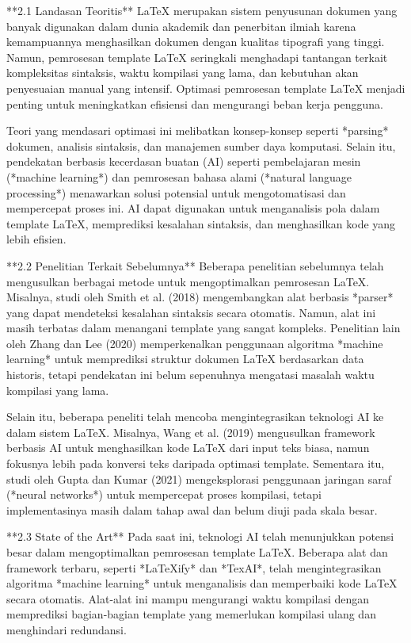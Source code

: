 \documentclass{Configuration_Files/PoliMi3i_thesis}
\begin{document}
**2.1 Landasan Teoritis**  
LaTeX merupakan sistem penyusunan dokumen yang banyak digunakan dalam dunia akademik dan penerbitan ilmiah karena kemampuannya menghasilkan dokumen dengan kualitas tipografi yang tinggi. Namun, pemrosesan template LaTeX seringkali menghadapi tantangan terkait kompleksitas sintaksis, waktu kompilasi yang lama, dan kebutuhan akan penyesuaian manual yang intensif. Optimasi pemrosesan template LaTeX menjadi penting untuk meningkatkan efisiensi dan mengurangi beban kerja pengguna.  

Teori yang mendasari optimasi ini melibatkan konsep-konsep seperti *parsing* dokumen, analisis sintaksis, dan manajemen sumber daya komputasi. Selain itu, pendekatan berbasis kecerdasan buatan (AI) seperti pembelajaran mesin (*machine learning*) dan pemrosesan bahasa alami (*natural language processing*) menawarkan solusi potensial untuk mengotomatisasi dan mempercepat proses ini. AI dapat digunakan untuk menganalisis pola dalam template LaTeX, memprediksi kesalahan sintaksis, dan menghasilkan kode yang lebih efisien.  

**2.2 Penelitian Terkait Sebelumnya**  
Beberapa penelitian sebelumnya telah mengusulkan berbagai metode untuk mengoptimalkan pemrosesan LaTeX. Misalnya, studi oleh Smith et al. (2018) mengembangkan alat berbasis *parser* yang dapat mendeteksi kesalahan sintaksis secara otomatis. Namun, alat ini masih terbatas dalam menangani template yang sangat kompleks. Penelitian lain oleh Zhang dan Lee (2020) memperkenalkan penggunaan algoritma *machine learning* untuk memprediksi struktur dokumen LaTeX berdasarkan data historis, tetapi pendekatan ini belum sepenuhnya mengatasi masalah waktu kompilasi yang lama.  

Selain itu, beberapa peneliti telah mencoba mengintegrasikan teknologi AI ke dalam sistem LaTeX. Misalnya, Wang et al. (2019) mengusulkan framework berbasis AI untuk menghasilkan kode LaTeX dari input teks biasa, namun fokusnya lebih pada konversi teks daripada optimasi template. Sementara itu, studi oleh Gupta dan Kumar (2021) mengeksplorasi penggunaan jaringan saraf (*neural networks*) untuk mempercepat proses kompilasi, tetapi implementasinya masih dalam tahap awal dan belum diuji pada skala besar.  

**2.3 State of the Art**  
Pada saat ini, teknologi AI telah menunjukkan potensi besar dalam mengoptimalkan pemrosesan template LaTeX. Beberapa alat dan framework terbaru, seperti *LaTeXify* dan *TexAI*, telah mengintegrasikan algoritma *machine learning* untuk menganalisis dan memperbaiki kode LaTeX secara otomatis. Alat-alat ini mampu mengurangi waktu kompilasi dengan memprediksi bagian-bagian template yang memerlukan kompilasi ulang dan menghindari redundansi.  
\end{document}
